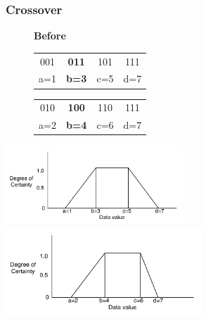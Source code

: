 \documentclass{beamer}
\begin{document}
\begin{frame}
  \frametitle{Crossover}
\begin{figure}
\begin{small}
\textbf{Before}
	\begin{tabular}{|cccc|} \hline
	001 & \textbf{011} & 101 & 111\\
	a=1 & \textbf{b=3} & c=5 & d=7\\
	\hline\end{tabular}
	\quad
	\begin{tabular}{|cccc|} \hline
	010 & \textbf{100} & 110 & 111\\
	a=2 & \textbf{b=4} & c=6 & d=7\\
	\hline\end{tabular}
\end{small}
\end{figure}
	\includegraphics[width=0.50\textwidth]{../Talk/MutCrossTrapezoids/cross1357.pdf}
	\includegraphics[width=0.55\textwidth]{../Talk/MutCrossTrapezoids/cross2467.pdf}
	

\end{frame}
\end{document}
